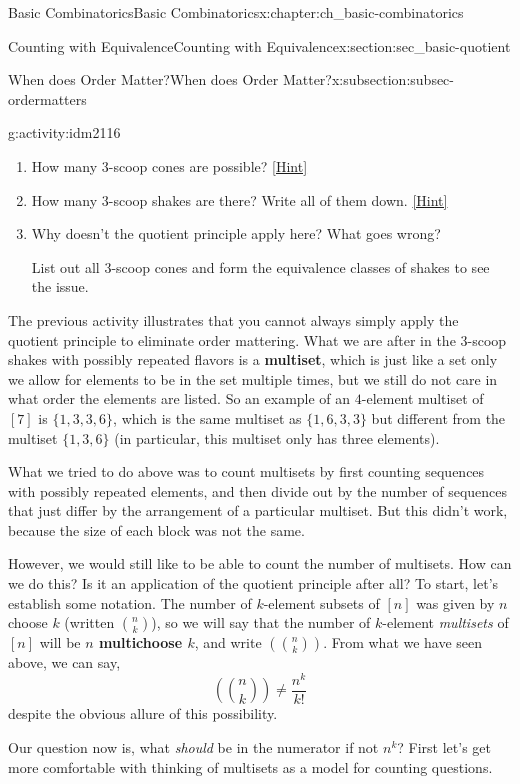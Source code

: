 \documentclass[oneside,10pt,]{book}
\newcommand{\terminology}[1]{\textbf{#1}}
\numberwithin{equation}{chapter}
\newcommand{\mchoose}[2]{\left(\!\binom{#1}{#2}\!\right)}
\begin{document}
\begin{chapterptx}{Basic Combinatorics}{}{Basic Combinatorics}{}{}{x:chapter:ch_basic-combinatorics}
\begin{sectionptx}{Counting with Equivalence}{}{Counting with Equivalence}{}{}{x:section:sec_basic-quotient}
\begin{subsectionptx}{When does Order Matter?}{}{When does Order Matter?}{}{}{x:subsection:subsec-ordermatters}
\begin{activity}{}{g:activity:idm2116}
\begin{enumerate}[font=\bfseries,label=(\alph*),ref=\alph*]
\item{}How many 3-scoop cones are possible?%
\space\hspace*{0pt}\hfill{\tiny\hyperlink{g:hint:idm2122-back}{[Hint]}}\item{}How many 3-scoop shakes are there?  Write all of them down.%
\space\hspace*{0pt}\hfill{\tiny\hyperlink{g:hint:idm2127-back}{[Hint]}}\item{}Why doesn't the quotient principle apply here?  What goes wrong?%
\par
List out all 3-scoop cones and form the equivalence classes of shakes to see the issue.%
\end{enumerate}
\end{activity}
The previous activity illustrates that you cannot always simply apply the quotient principle to eliminate order mattering.  What we are after in the 3-scoop shakes with possibly repeated flavors is a \terminology{multiset}, which is just like a set only we allow for elements to be in the set multiple times, but we still do not care in what order the elements are listed.  So an example of an \(4\)-element multiset of \([7]\) is \(\{1,3,3,6\}\), which is the same multiset as \(\{1,6,3,3\}\) but different from the multiset \(\{1,3,6\}\) (in particular, this multiset only has three elements).%
\par
What we tried to do above was to count multisets by first counting sequences with possibly repeated elements, and then divide out by the number of sequences that just differ by the arrangement of a particular multiset.  But this didn't work, because the size of each block was not the same.%
\par
However, we would still like to be able to count the number of multisets.  How can we do this?  Is it an application of the quotient principle after all?  To start, let's establish some notation.  The number of \(k\)-element subsets of \([n]\) was given by \(n\) choose \(k\) (written \(\binom{n}{k}\)), so we will say that the number of \(k\)-element \emph{multisets} of \([n]\) will be \terminology{\(n\) multichoose \(k\)}, and write \(\mchoose{n}{k}\).  From what we have seen above, we can say,%
\begin{equation*}
\mchoose{n}{k} \ne \frac{n^k}{k!}
\end{equation*}
despite the obvious allure of this possibility.%
\par
Our question now is, what \emph{should} be in the numerator if not \(n^k\)?  First let's get more comfortable with thinking of multisets as a model for counting questions.%

\end{subsectionptx}
\end{sectionptx}
\end{chapterptx}
\end{document}
